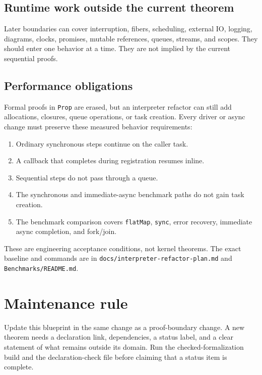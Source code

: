 \section{Runtime work outside the current theorem}

\begin{definition}
\label{def:whole-runtime-extension}
\notready
Later boundaries can cover interruption, fibers, scheduling, external IO,
logging, diagrams, clocks, promises, mutable references, queues, streams, and
scopes. They should enter one behavior at a time. They are not implied by the
current sequential proofs.
\end{definition}

\section{Performance obligations}

Formal proofs in \texttt{Prop} are erased, but an interpreter refactor can
still add allocations, closures, queue operations, or task creation. Every
driver or async change must preserve these measured behavior requirements:

\begin{enumerate}
  \item Ordinary synchronous steps continue on the caller task.
  \item A callback that completes during registration resumes inline.
  \item Sequential steps do not pass through a queue.
  \item The synchronous and immediate-async benchmark paths do not gain task
    creation.
  \item The benchmark comparison covers \texttt{flatMap}, \texttt{sync},
    error recovery, immediate async completion, and fork/join.
\end{enumerate}

These are engineering acceptance conditions, not kernel theorems. The exact
baseline and commands are in \texttt{docs/interpreter-refactor-plan.md} and
\texttt{Benchmarks/README.md}.

\chapter{Maintenance rule}

Update this blueprint in the same change as a proof-boundary change. A new
theorem needs a declaration link, dependencies, a status label, and a clear
statement of what remains outside its domain. Run the checked-formalization
build and the declaration-check file before claiming that a status item is
complete.
